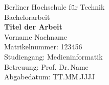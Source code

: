 \begin{titlepage}
\begin{center}
  {\LARGE Berliner Hochschule für Technik\\}
  \vspace{1cm}
  {\Large Bachelorarbeit\\}
  \vspace{2cm}
  {\huge\textbf{Titel der Arbeit}\\}
  \vfill
  {Vorname Nachname\\
  Matrikelnummer: 123456\\
  Studiengang: Medieninformatik\\}
  \vspace{1cm}
  {Betreuung: Prof. Dr.\,Name\\
  Abgabedatum: TT.MM.JJJJ}
\end{center}
\end{titlepage}
